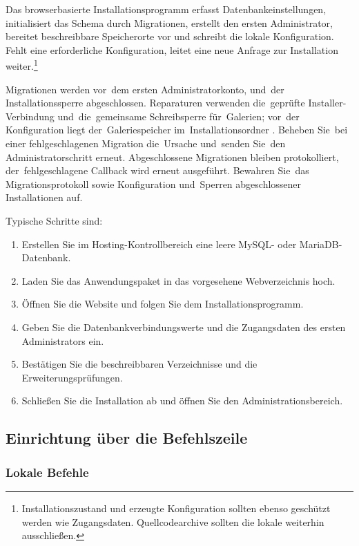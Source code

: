 \documentclass[11pt,a4paper]{article}
\newcommand{\filepath}[1]{\path{#1}}
\begin{document}
Das browserbasierte Installationsprogramm erfasst Datenbankeinstellungen,
initialisiert das Schema durch Migrationen, erstellt den ersten Administrator,
bereitet beschreibbare Speicherorte vor und schreibt die lokale Konfiguration.
Fehlt eine erforderliche Konfiguration, leitet eine neue Anfrage zur
Installation weiter.\footnote{Installationszustand und erzeugte Konfiguration
sollten ebenso geschützt werden wie Zugangsdaten. Quellcodearchive sollten die
lokale \filepath{config.php} weiterhin ausschließen.}

Migrationen werden vor~dem ersten Administratorkonto, \filepath{config.php}
und~der Installationssperre abgeschlossen. Reparaturen verwenden die~geprüfte
Installer-Verbindung und~die~gemeinsame Schreibsperre für~Galerien; vor~der
Konfiguration liegt der~Galeriespeicher im~Installationsordner
\filepath{galleries/}. Beheben Sie~bei einer fehlgeschlagenen Migration
die~Ursache und~senden Sie~den Administratorschritt erneut. Abgeschlossene
Migrationen bleiben protokolliert, der~fehlgeschlagene Callback wird erneut
ausgeführt. Bewahren Sie~das Migrationsprotokoll sowie Konfiguration und~Sperren
abgeschlossener Installationen auf.

Typische Schritte sind:

\begin{enumerate}
  \item Erstellen Sie im Hosting-Kontrollbereich eine leere MySQL- oder
  MariaDB-Datenbank.
  \item Laden Sie das Anwendungspaket in das vorgesehene Webverzeichnis hoch.
  \item Öffnen Sie die Website und folgen Sie dem Installationsprogramm.
  \item Geben Sie die Datenbankverbindungswerte und die Zugangsdaten des ersten
  Administrators ein.
  \item Bestätigen Sie die beschreibbaren Verzeichnisse und die
  Erweiterungsprüfungen.
  \item Schließen Sie die Installation ab und öffnen Sie den
  Administrationsbereich.
\end{enumerate}

\subsection{Einrichtung über die Befehlszeile}

\subsubsection{Lokale Befehle}
\end{document}
